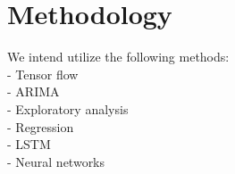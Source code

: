 \section{Methodology}

We intend utilize the following methods:\\
- Tensor flow \\
- ARIMA \\
- Exploratory analysis \\
- Regression\\
- LSTM\\
- Neural networks